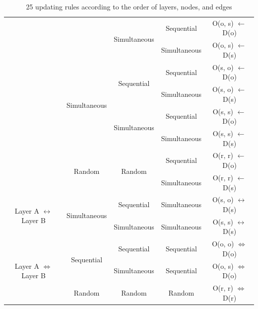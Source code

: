 \begin{table}[htp]
\begin{center}
\begin{tabular}{c|c|c|c|c}
			&                                & \multirow{2}{*}{Simultaneous}      & Sequential             & O(o, s) $\leftarrow$ D(o) \\  \cline{4-5} 
			&                                &                                    & Simultaneous           & O(o, s) $\leftarrow$ D(s) \\  \cline{2-5} 
			& \multirow{4}{*}{Simultaneous}  & \multirow{2}{*}{Sequential}        & Sequential             & O(s, o) $\leftarrow$ D(o) \\  \cline{4-5}
			&                                &                                    & Simultaneous           & O(s, o) $\leftarrow$ D(s) \\  \cline{3-5}
			&                                & \multirow{2}{*}{Simultaneous}      & Sequential             & O(s, s) $\leftarrow$ D(o) \\  \cline{4-5}
			&                                &                                    & Simultaneous           & O(s, s) $\leftarrow$ D(s) \\  \cline{2-5}
			& \multirow{2}{*}{Random}        & \multirow{2}{*}{Random}            & Sequential             & O(r, r) $\leftarrow$ D(o) \\  \cline{4-5}
			&                                &                                    & Simultaneous           & O(r, r) $\leftarrow$ D(s) \\   \hline
			\multirow{2}{*}{Layer A $\leftrightarrow$ Layer B}& \multirow{2}{*}{Simultaneous}& Sequential                         & Simultaneous           & O(s, o) $\leftrightarrow$ D(s) \\ \cline{3-5}
			&                                & Simultaneous                       & Simultaneous           & O(s, s) $\leftrightarrow$ D(s) \\ \hline
			\multirow{3}{*}{Layer A $\Leftrightarrow$ Layer B}& \multirow{2}{*}{Sequential}  & Sequential                         & Sequential             & O(o, o) $\Leftrightarrow$ D(o) \\ \cline{3-5}
			&                                & Simultaneous                       & Sequential             & O(o, s) $\Leftrightarrow$ D(o) \\ \cline{2-5}
			& Random                         & Random                             & Random                 & O(r, r) $\Leftrightarrow$ D(r) \\ \hline
			
		\end{tabular}
	\end{center}
	\caption{25 updating rules according to the order of layers, nodes, and edges}
	\label{25updating_rules}
\end{table}

